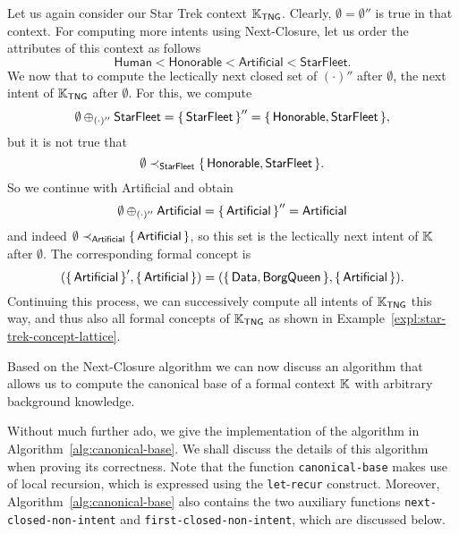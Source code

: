 \begin{Example}
  \label{expl:9}
  Let us again consider our Star Trek context ${\mathbb{K}}_{\mathsf{TNG}}$.  Clearly,
  $\emptyset = \emptyset''$ is true in that context.  For computing more intents using
  Next-Closure, let us order the attributes of this context as follows
  \begin{equation*}
    \mathsf{Human} < \mathsf{Honorable} < \mathsf{Artificial} < \mathsf{StarFleet}.
  \end{equation*}
  We now that to compute the lectically next closed set of $(\cdot)''$ after $\emptyset$,
  \ie the next intent of ${\mathbb{K}}_{\mathsf{TNG}}$ after $\emptyset$.  For this, we compute
  \begin{equation*}
    \emptyset \oplus_{(\cdot)''} \mathsf{StarFleet} = {\{\,\mathsf{StarFleet}\,\}}'' = {\{\,
      \mathsf{Honorable}, \mathsf{StarFleet} \,\}},
  \end{equation*}
  but it is not true that
  \begin{equation*}
    \emptyset \prec_{\mathsf{StarFleet}} {\{\, \mathsf{Honorable}, \mathsf{StarFleet} \,\}}.
  \end{equation*}
  So we continue with \textsf{Artificial} and obtain
  \begin{equation*}
    \emptyset \oplus_{(\cdot)''} \mathsf{Artificial} = {\{\, \mathsf{Artificial} \,\}}'' = \mathsf{Artificial}
  \end{equation*}
  and indeed $\emptyset \prec_{\mathsf{Artificial}} {\{\, \mathsf{Artificial} \,\}}$, so this
  set is the lectically next intent of ${\mathbb{K}}$ after $\emptyset$.  The corresponding
  formal concept is
  \begin{equation*}
    ({\{\, \mathsf{Artificial} \,\}}', {\{\, \mathsf{Artificial} \,\}}) = ({\{\, \mathsf{Data},
      \mathsf{BorgQueen} \,\}}, {\{\, \mathsf{Artificial} \,\}}).
  \end{equation*}
  Continuing this process, we can successively compute all intents of ${\mathbb{K}}_{\mathsf{TNG}}$ this way, and thus also all formal concepts of ${\mathbb{K}}_{\mathsf{TNG}}$
  as shown in Example~\ref{expl:star-trek-concept-lattice}.
\end{Example}

Based on the Next-Closure algorithm we can now discuss an algorithm that allows us to
compute the canonical base of a formal context ${\mathbb{K}}$ with arbitrary background
knowledge.


Without much further ado, we give the implementation of the algorithm in
Algorithm~\ref{alg:canonical-base}.  We shall discuss the details of this algorithm when
proving its correctness.  Note that the function \lstinline{canonical-base} makes use of
local recursion, which is expressed using the \lstinline{let}-\lstinline{recur}
construct.  Moreover,
Algorithm~\ref{alg:canonical-base} also contains the two auxiliary functions
\lstinline{next-closed-non-intent} and \lstinline{first-closed-non-intent}, which are
discussed below.

